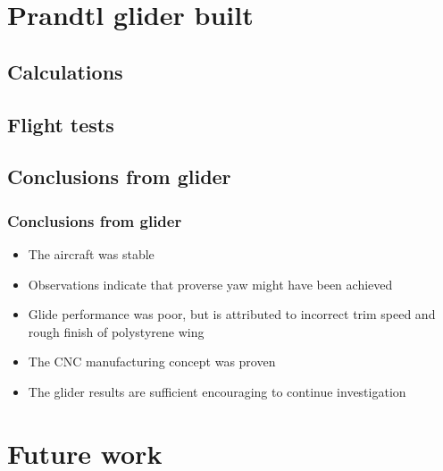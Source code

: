 \documentclass{beamer}
\begin{document}
\section{Prandtl glider built}

\subsection{Calculations} %

\subsection{Flight tests}

\subsection{Conclusions from glider}

\begin{frame}
\frametitle{Conclusions from glider}

\begin{itemize}
\item The aircraft was stable
\item Observations indicate that proverse yaw might have been achieved
\item Glide performance was poor, but is attributed to incorrect trim speed and rough finish of polystyrene wing
\item The CNC manufacturing concept was proven
\item The glider results are sufficient encouraging to continue investigation
\end{itemize}

\end{frame}





\section{Future work}
\end{document}
